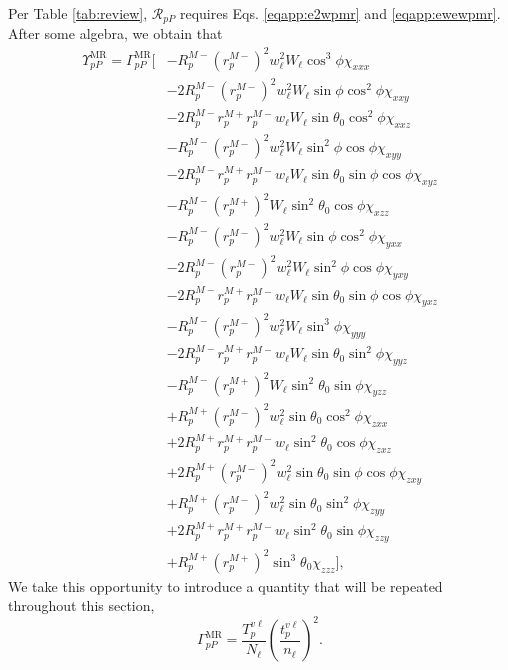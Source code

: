 Per Table \ref{tab:review}, $\mathcal{R}_{pP}$ requires Eqs. \eqref{eqapp:e2wpmr}
and \eqref{eqapp:ewewpmr}. After some algebra, we obtain that
\begin{equation}\label{eqapp:rppfullmr}
\begin{split}
\Upsilon^{\mathrm{MR}}_{pP} =
\Gamma^{\mathrm{MR}}_{pP}
\bigg[
&-R^{M-}_{p}\left(r^{M-}_{p}\right)^{2}w^{2}_{\ell}W_{\ell}\cos^{3}\phi
\chi_{xxx}\\
&-2R^{M-}_{p}\left(r^{M-}_{p}\right)^{2}w^{2}_{\ell}W_{\ell}\sin\phi\cos^{2}\phi
\chi_{xxy}\\
&-2R^{M-}_{p}r^{M+}_{p}r^{M-}_{p}w_{\ell}W_{\ell}\sin\theta_{0}\cos^{2}\phi
\chi_{xxz}\\
&-R^{M-}_{p}\left(r^{M-}_{p}\right)^{2}w^{2}_{\ell}W_{\ell}\sin^{2}\phi\cos\phi
\chi_{xyy}\\
&-2R^{M-}_{p}r^{M+}_{p}r^{M-}_{p}w_{\ell}W_{\ell}\sin\theta_{0}\sin\phi\cos\phi
\chi_{xyz}\\
&-R^{M-}_{p}\left(r^{M+}_{p}\right)^{2}W_{\ell}\sin^{2}\theta_{0}\cos\phi
\chi_{xzz}\\
&-R^{M-}_{p}\left(r^{M-}_{p}\right)^{2}w^{2}_{\ell}W_{\ell}\sin\phi\cos^{2}\phi
\chi_{yxx}\\
&-2R^{M-}_{p}\left(r^{M-}_{p}\right)^{2}w^{2}_{\ell}W_{\ell}\sin^{2}\phi\cos\phi
\chi_{yxy}\\
&-2R^{M-}_{p}r^{M+}_{p}r^{M-}_{p}w_{\ell}W_{\ell}\sin\theta_{0}\sin\phi\cos\phi
\chi_{yxz}\\
&-R^{M-}_{p}\left(r^{M-}_{p}\right)^{2}w^{2}_{\ell}W_{\ell}\sin^{3}\phi
\chi_{yyy}\\
&-2R^{M-}_{p}r^{M+}_{p}r^{M-}_{p}w_{\ell}W_{\ell}\sin\theta_{0}\sin^{2}\phi
\chi_{yyz}\\
&-R^{M-}_{p}\left(r^{M+}_{p}\right)^{2}W_{\ell}\sin^{2}\theta_{0}\sin\phi
\chi_{yzz}\\
&+R^{M+}_{p}\left(r^{M-}_{p}\right)^{2}w^{2}_{\ell}\sin\theta_{0}\cos^{2}\phi
\chi_{zxx}\\
&+2R^{M+}_{p}r^{M+}_{p}r^{M-}_{p}w_{\ell}\sin^{2}\theta_{0}\cos\phi
\chi_{zxz}\\
&+2R^{M+}_{p}\left(r^{M-}_{p}\right)^{2}w^{2}_{\ell}\sin\theta_{0}\sin\phi
\cos\phi\chi_{zxy}\\
&+R^{M+}_{p}\left(r^{M-}_{p}\right)^{2}w^{2}_{\ell}\sin\theta_{0}\sin^{2}\phi
\chi_{zyy}\\
&+2R^{M+}_{p}r^{M+}_{p}r^{M-}_{p}w_{\ell}\sin^{2}\theta_{0}\sin\phi
\chi_{zzy}\\
&+R^{M+}_{p}\left(r^{M+}_{p}\right)^{2}\sin^{3}\theta_{0}
\chi_{zzz}
\bigg],
\end{split}
\end{equation}
We take this opportunity to introduce a quantity that will be repeated
throughout this section,
\begin{equation}\label{eqapp:gammappmr}
\Gamma^{\mathrm{MR}}_{pP} =
\frac{T^{v\ell}_{p}}{N_{\ell}}
\left(\frac{t^{v\ell}_{p}}{n_{\ell}}\right)^{2}.
\end{equation}

